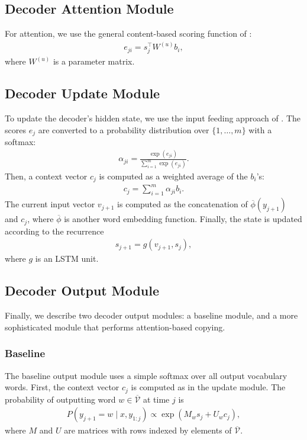 \documentclass[11pt,letterpaper]{article}
\newcommand{\vocabout}{\overline{\mathcal{V}}}
\newcommand{\phiout}{\overline{\phi}}
\begin{document}
\subsection{Decoder Attention Module}
For attention, we use the general content-based scoring function of
:
\begin{align}
  e_{ji} = s_j^\top W^{(u)} b_i,
\end{align}
where $W^{(u)}$ is a parameter matrix.

\subsection{Decoder Update Module}
To update the decoder's hidden state,
we use the input feeding approach of .
The scores $e_j$ are converted to a probability distribution 
over $\{1, \dotsc, m\}$ with a softmax:
\begin{align}
  \alpha_{ji} = \frac{\exp(e_{ji})}{\sum_{i=1}^m \exp(e_{ji})}.
\end{align}
Then, a context vector $c_j$ is computed as a weighted average of the $b_i$'s:
\begin{align}
  c_j = \sum_{i=1}^m \alpha_{ji} b_i.
\end{align}
The current input vector $v_{j+1}$ is computed as 
the concatenation of $\phiout(y_{j+1})$ and $c_{j}$,
where $\phiout$ is another word embedding function.
Finally, the state is updated according to the recurrence
\begin{align}
  s_{j+1} = g(v_{j+1}, s_j),
\end{align}
where $g$ is an LSTM unit.

\subsection{Decoder Output Module}
Finally, we describe two decoder output modules: a baseline module, and a
more sophisticated module that performs attention-based copying.

\subsubsection{Baseline}
\label{sec:baseline-output}
The baseline output module uses a simple softmax over all
output vocabulary words.
First, the context vector $c_j$ is computed as in the update module.
The probability of outputting word $w \in \vocabout$ at time $j$ is
\begin{align}
  P(y_{j+1} = w \mid x, y_{1:j}) \propto \exp(M_{w} s_j + U_w c_j),
\end{align}
where $M$ and $U$ are matrices with rows indexed by elements of $\vocabout$.
\end{document}
